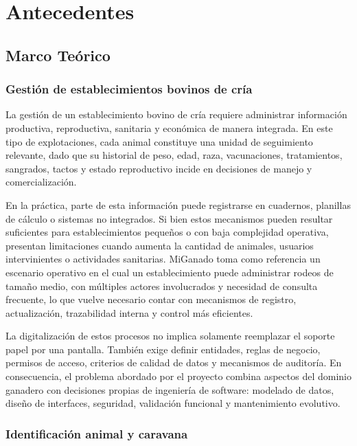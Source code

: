\chapter{Antecedentes}\label{chapter:antecedentes}

\section{Marco Te\'orico}

\subsection{Gesti\'on de establecimientos bovinos de cr\'ia}

La gesti\'on de un establecimiento bovino de cr\'ia requiere administrar informaci\'on productiva, reproductiva, sanitaria y econ\'omica de manera integrada. En este tipo de explotaciones, cada animal constituye una unidad de seguimiento relevante, dado que su historial de peso, edad, raza, vacunaciones, tratamientos, sangrados, tactos y estado reproductivo incide en decisiones de manejo y comercializaci\'on.

En la pr\'actica, parte de esta informaci\'on puede registrarse en cuadernos, planillas de c\'alculo o sistemas no integrados. Si bien estos mecanismos pueden resultar suficientes para establecimientos peque\~nos o con baja complejidad operativa, presentan limitaciones cuando aumenta la cantidad de animales, usuarios intervinientes o actividades sanitarias. MiGanado toma como referencia un escenario operativo en el cual un establecimiento puede administrar rodeos de tama\~no medio, con m\'ultiples actores involucrados y necesidad de consulta frecuente, lo que vuelve necesario contar con mecanismos de registro, actualizaci\'on, trazabilidad interna y control m\'as eficientes.

La digitalizaci\'on de estos procesos no implica solamente reemplazar el soporte papel por una pantalla. Tambi\'en exige definir entidades, reglas de negocio, permisos de acceso, criterios de calidad de datos y mecanismos de auditor\'ia. En consecuencia, el problema abordado por el proyecto combina aspectos del dominio ganadero con decisiones propias de ingenier\'ia de software: modelado de datos, dise\~no de interfaces, seguridad, validaci\'on funcional y mantenimiento evolutivo.

\subsection{Identificaci\'on animal y caravana}

